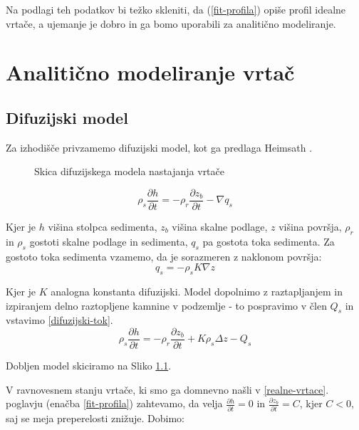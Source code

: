 \documentclass[a4paper, oneside, 12pt]{book}
\begin{document}
Na podlagi teh podatkov bi težko skleniti, da (\ref{fit-profila}) opiše profil idealne vrtače, a ujemanje je dobro in ga bomo uporabili za analitično modeliranje. 


\chapter{Analitično modeliranje vrtač}
\label{ch3}

\section{Difuzijski model}

Za izhodišče privzamemo difuzijski model, kot ga predlaga Heimsath \cite{Heimsath2001}.

\begin{figure}[H]
  \centering
  
  \caption{Skica difuzijskega modela nastajanja vrtače}
  \label{fig:difuzijski-model}
\end{figure}

\begin{equation}
  \rho_s \frac{\partial h}{\partial t} = -\rho_r \frac{\partial z_b}{\partial t} - \nabla q_s
  \label{kontinuitetna-enacba-original}
\end{equation}

Kjer je $h$ višina stolpca sedimenta, $z_b$ višina skalne podlage, $z$ višina površja, $\rho_r$ in $\rho_s$ gostoti skalne podlage in sedimenta, $q_s$ pa gostota toka sedimenta. Za gostoto toka sedimenta vzamemo, da je sorazmeren z naklonom površja:
\begin{equation}
  q_s = - \rho_s K \nabla z
  \label{difuzijski-tok}
\end{equation}

Kjer je $K$ analogna konstanta difuzijski.
Model dopolnimo z raztapljanjem in izpiranjem delno raztopljene kamnine v podzemlje - to pospravimo v člen $Q_s$ in vstavimo \ref{difuzijski-tok}.
\begin{equation}
  \rho_s \frac{\partial h}{\partial t} = -\rho_r \frac{\partial z_b}{\partial t} + K \rho_s \Delta z - Q_s
  \label{kontinuitetna-enacba}
\end{equation}

Dobljen model skiciramo na Sliko \ref{fig:difuzijski-model}.

V ravnovesnem stanju vrtače, ki smo ga domnevno našli v \ref{realne-vrtace}. poglavju (enačba \ref{fit-profila}) zahtevamo, da velja $\frac{\partial h}{\partial t} = 0$ in $\frac{\partial z_b}{\partial t} = C$, kjer $C<0$, saj se meja preperelosti znižuje. Dobimo:
\end{document}
